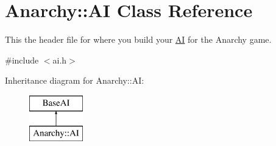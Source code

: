\hypertarget{classAnarchy_1_1AI}{\section{Anarchy\-:\-:A\-I Class Reference}
\label{classAnarchy_1_1AI}
}


This the header file for where you build your \hyperlink{classAnarchy_1_1AI}{A\-I} for the Anarchy game.  




{\ttfamily \#include $<$ai.\-h$>$}

Inheritance diagram for Anarchy\-:\-:A\-I\-:\begin{figure}[H]
\begin{center}
\leavevmode
\includegraphics[height=2.000000cm]{classAnarchy_1_1AI}
\end{center}
\end{figure}
